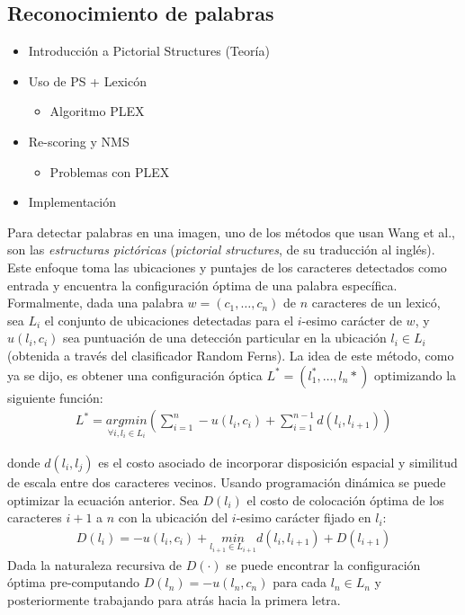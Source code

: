 \subsection{Reconocimiento de palabras}
	\begin{itemize}
		\item Introducción a Pictorial Structures (Teoría)
		\item Uso de PS + Lexicón
		\begin{itemize}
			\item Algoritmo PLEX
		\end{itemize}
		\item Re-scoring y NMS
		\begin{itemize}
			\item Problemas con PLEX
		\end{itemize}
		\item Implementación
	\end{itemize}
	
	Para detectar palabras en una imagen, uno de los métodos que usan Wang et al., son las \textit{estructuras pictóricas} (\textit{pictorial structures}, de su traducción al inglés). Este enfoque toma las ubicaciones y puntajes de los caracteres detectados como entrada y encuentra la configuración óptima de una palabra específica. Formalmente, dada una palabra $w=(c_1,\dots , c_n)$ de $n$ caracteres de un lexicó, sea $L_i$ el conjunto de ubicaciones detectadas para el $i$-esimo carácter de $w$, y $u(l_i, c_i)$ sea puntuación de una detección particular en la ubicación $l_i \in L_i$ (obtenida a través del clasificador Random Ferns). La idea de este método, como ya se dijo, es obtener una configuración óptica $L^{*}=(l_1^{*}, \dots, l_n{*})$ optimizando la siguiente función:
	\begin{align}
		L^{*} = \underset{\forall i, l_i\in L_i}{argmin}\left( \sum_{i=1}^n -u(l_i, c_i) + \sum_{i=1}^{n-1} d(l_i,l_{i+1}) \right)
	\end{align}		
	
	donde $d(l_i, l_j)$ es el costo asociado de incorporar disposición espacial y similitud de escala entre dos caracteres vecinos. Usando programación dinámica se puede optimizar la ecuación anterior. Sea $D(l_i)$ el costo de colocación óptima de los caracteres $i+1$ a $n$ con la ubicación del $i$-esimo carácter fijado en $l_i$:
	\begin{align}
		D(l_i) = -u(l_i,c_i) + \underset{l_{i+1}\in L_{i+1}}{min} d(l_i,l_{i+1}) + D(l_{i+1})
	\end{align}
	Dada la naturaleza recursiva de $D(\cdot)$ se puede encontrar la configuración óptima pre-computando $D(l_n) = -u(l_n,c_n)$ para cada $l_n \in L_n$ y posteriormente trabajando para atrás hacia la primera letra.
	
